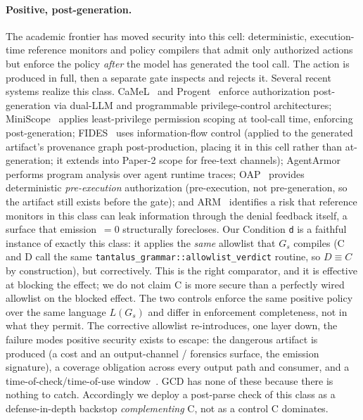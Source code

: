 \paragraph{Positive, post-generation.}
The academic frontier has moved security into this cell: deterministic, execution-time reference monitors and policy compilers that admit only authorized actions but enforce the policy \emph{after} the model has generated the tool call. The action is produced in full, then a separate gate inspects and rejects it. Several recent systems realize this class. CaMeL~\cite{camel2025} and Progent~\cite{progent2025} enforce authorization post-generation via dual-LLM and programmable privilege-control architectures; MiniScope~\cite{miniscope2025} applies least-privilege permission scoping at tool-call time, enforcing post-generation; FIDES~\cite{fides2025} uses information-flow control (applied to the generated artifact's provenance graph post-production, placing it in this cell rather than at-generation; it extends into Paper-2 scope for free-text channels); AgentArmor~\cite{agentarmor2025} performs program analysis over agent runtime traces; OAP~\cite{oap2026} provides deterministic \emph{pre-execution} authorization (pre-execution, not pre-generation, so the artifact still exists before the gate); and ARM~\cite{arm2026} identifies a risk that reference monitors in this class can leak information through the denial feedback itself, a surface that emission~\(=0\) structurally forecloses. Our Condition \texttt{d} is a faithful instance of exactly this class: it applies the \emph{same} allowlist that \(G_s\) compiles (C and D call the same \texttt{tantalus\_grammar::allowlist\_verdict} routine, so \(D \equiv C\) by construction), but correctively. This is the right comparator, and it is effective at blocking the effect; we do not claim C is more secure than a perfectly wired allowlist on the blocked effect. The two controls enforce the same positive policy over the same language \(L(G_s)\) and differ in enforcement completeness, not in what they permit. The corrective allowlist re-introduces, one layer down, the failure modes positive security exists to escape: the dangerous artifact is produced (a cost and an output-channel / forensics surface, the emission signature), a coverage obligation across every output path and consumer, and a time-of-check/time-of-use window~\cite{saltzer1975}. GCD has none of these because there is nothing to catch. Accordingly we deploy a post-parse check of this class as a defense-in-depth backstop \emph{complementing} C, not as a control C dominates.

